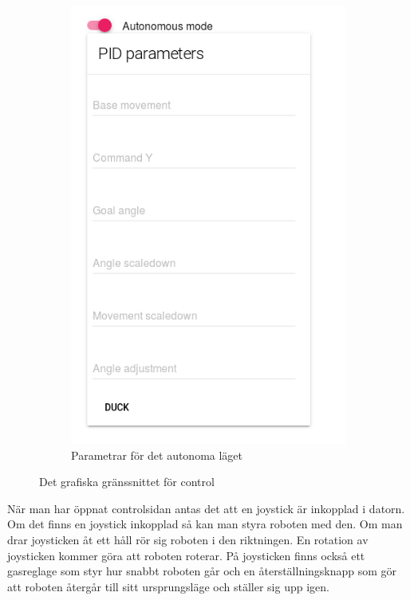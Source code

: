 \documentclass[a4paper,titlepage,12pt]{article}
\begin{document}
\begin{figure}[h]
\begin{subfigure}{.4\textwidth}
		\includegraphics[width=1\linewidth]{images/gui-parameters.png}
		\caption{Parametrar för det autonoma läget}
      \end{subfigure}
      \caption{Det grafiska gränssnittet för control\label{fig:gui-control}}
	\end{figure}
	
	När man har öppnat controlsidan antas det att en joystick är inkopplad i
    datorn. Om det finns en joystick inkopplad så kan man styra roboten med den.
    Om man drar joysticken åt ett håll rör sig roboten i den riktningen. En
    rotation av joysticken kommer göra att roboten roterar. På joysticken
    finns också ett gasreglage som styr hur snabbt roboten går och en
    återställningsknapp som gör att roboten återgår till sitt ursprungsläge och
    ställer sig upp igen.
\end{document}
